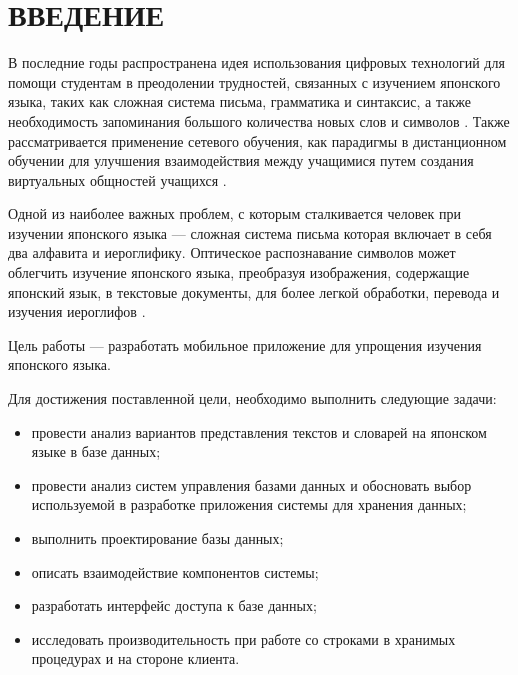 \chapter*{ВВЕДЕНИЕ}

В последние годы распространена идея использования цифровых
технологий для помощи студентам в преодолении трудностей,
связанных с изучением японского языка, таких как сложная система
письма, грамматика и синтаксис, а также необходимость запоминания
большого количества новых слов и символов \cite{muhtarova}.
Также рассматривается применение сетевого обучения, как парадигмы в
дистанционном обучении для улучшения взаимодействия между
учащимися путем создания виртуальных общностей учащихся \cite{edu-network}.

Одной из наиболее важных проблем, с которым сталкивается человек
при изучении японского языка --- сложная система письма которая
включает в себя два алфавита и иероглифику. Оптическое распознавание
символов может облегчить изучение японского языка, преобразуя
изображения, содержащие японский язык, в текстовые документы,
для более легкой обработки, перевода и изучения иероглифов \cite{ocr-usage}.

Цель работы --- разработать мобильное приложение для упрощения
изучения японского языка.

Для достижения поставленной цели, необходимо выполнить следующие
задачи:

\begin{itemize}[label={$-$}]
  \item провести анализ вариантов представления текстов и словарей
    на японском языке в базе данных;
  \item провести анализ систем управления базами данных и обосновать
    выбор используемой в разработке приложения системы для хранения данных;
  \item выполнить проектирование базы данных;
  \item описать взаимодействие компонентов системы;
  \item разработать интерфейс доступа к базе данных;
  \item исследовать производительность при работе со строками в хранимых процедурах
    и на стороне клиента.
\end{itemize}

